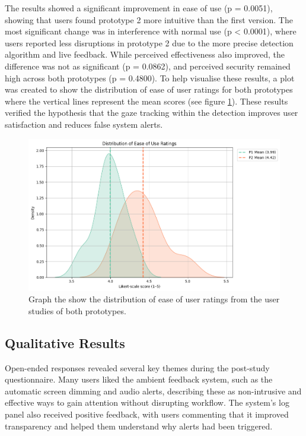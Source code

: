 \documentclass[12pt]{article}
\theoremstyle{plain}
\theoremstyle{definition}
\begin{document}
The results showed a significant improvement in ease of use (p = 0.0051), showing that users found prototype 2 more intuitive than the first version. The most significant change was in interference with normal use (p < 0.0001), where users reported less disruptions in prototype 2 due to the more precise detection algorithm and live feedback. While perceived effectiveness also improved, the difference was not as significant (p = 0.0862), and perceived security remained high across both prototypes (p = 0.4800). To help visualise these results, a plot was created to show the distribution of ease of user ratings for both prototypes where the vertical lines represent the mean scores (see figure \ref{fig:t-test}). These results verified the hypothesis that the gaze tracking within the detection improves user satisfaction and reduces false system alerts.

\begin{figure}
    \centering
    \includegraphics[width=1.0\linewidth]{img/ttest.png}
    \caption{Graph the show the distribution of ease of user ratings from the user studies of both prototypes.}
    \label{fig:t-test}
\end{figure}

\subsection{Qualitative Results}
\label{qualitative}

Open-ended responses revealed several key themes during the post-study questionnaire. Many users liked the ambient feedback system, such as the automatic screen dimming and audio alerts, describing these as non-intrusive and effective ways to gain attention without disrupting workflow. The system’s log panel also received positive feedback, with users commenting that it improved transparency and helped them understand why alerts had been triggered.
\end{document}
